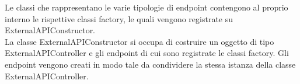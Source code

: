 Le classi che rappresentano le varie tipologie di endpoint contengono al proprio interno le rispettive classi factory, le quali vengono registrate su ExternalAPIConstructor.\\
La classe ExternalAPIConstructor si occupa di costruire un oggetto di tipo ExternalAPIController e gli endpoint di cui sono registrate le classi factory. Gli endpoint vengono creati in modo tale da condividere la stessa istanza della classe ExternalAPIController.
